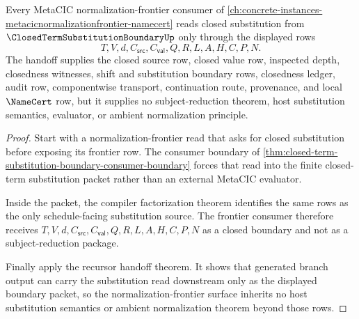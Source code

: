 \begin{theorem}
\label{thm:closed-term-substitution-boundary-normalization-frontier-handoff}
Every MetaCIC normalization-frontier consumer of \autoref{ch:concrete-instances-metacicnormalizationfrontier-namecert} reads closed substitution from $\ClosedTermSubstitutionBoundaryUp$ only through the displayed rows
$$
T,V,d,C_{\mathsf{src}},C_{\mathsf{val}},Q,R,L,A,H,C,P,N.
$$
The handoff supplies the closed source row, closed value row, inspected depth, closedness witnesses, shift and substitution boundary rows, closedness ledger, audit row, componentwise transport, continuation route, provenance, and local $\NameCert$ row, but it supplies no subject-reduction theorem, host substitution semantics, evaluator, or ambient normalization principle.
\end{theorem}
\begin{proof}
Start with a normalization-frontier read that asks for closed substitution before exposing its frontier row. The consumer boundary of \autoref{thm:closed-term-substitution-boundary-consumer-boundary} forces that read into the finite closed-term substitution packet rather than an external MetaCIC evaluator.

Inside the packet, the compiler factorization theorem identifies the same rows as the only schedule-facing substitution source. The frontier consumer therefore receives $T,V,d,C_{\mathsf{src}},C_{\mathsf{val}},Q,R,L,A,H,C,P,N$ as a closed boundary and not as a subject-reduction package.

Finally apply the recursor handoff theorem. It shows that generated branch output can carry the substitution read downstream only as the displayed boundary packet, so the normalization-frontier surface inherits no host substitution semantics or ambient normalization theorem beyond those rows.
\end{proof}


